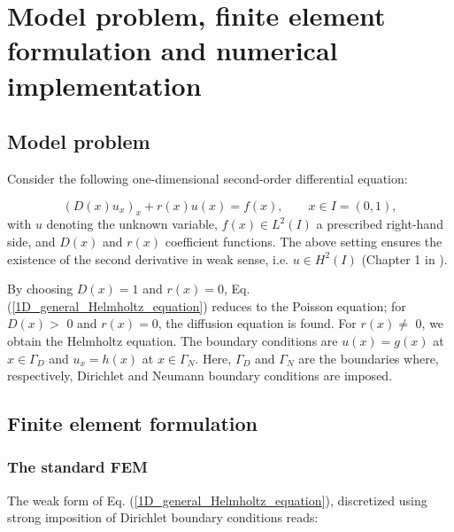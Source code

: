 \documentclass[final,3p]{elsarticle}
\begin{document}
\section{Model problem, finite element formulation and numerical implementation}	\label{model problem, FE formulation and solution method}

\subsection{Model problem}

Consider the following one-dimensional second-order differential equation:

\begin{equation}
  \left(D(x) u_x \right)_x + r(x)u(x) = f(x),\qquad x \in I = (0,1),	\label{1D_general_Helmholtz_equation}
\end{equation}
with $u$ denoting the unknown variable, $f(x) \in L^2 (I)$ a prescribed right-hand side, and $D(x)$ and $r(x)$ coefficient functions.	%
The above setting ensures the existence of the second derivative in weak sense, i.e. $u \in H^2 (I)$ (Chapter 1 in \citep{boffi2013mixed}).


By choosing $D(x)=1$ and $r(x)=0$, Eq. (\ref{1D_general_Helmholtz_equation}) reduces to the Poisson equation; for $D(x)>$ 0 and $r(x)=0$, the diffusion equation is found. For $r(x) \neq $ 0, we obtain the Helmholtz equation. 
The boundary conditions are $u(x)=g(x)$ at $x \in \Gamma_D$ and $u_x=h(x)$ at $x \in \Gamma_N$. Here, $\Gamma_D$ and $\Gamma_N$ are the boundaries where, respectively, Dirichlet and Neumann boundary conditions are imposed.

\subsection{Finite element formulation}		\label{FE formulation}

\subsubsection{The standard FEM} 

The weak form of Eq. (\ref{1D_general_Helmholtz_equation}), discretized using strong imposition of Dirichlet boundary conditions reads:
\end{document}
